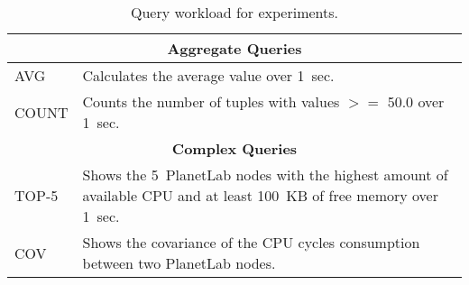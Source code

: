 \begin{table}[h!]
  \hspace{0.8cm}
  \renewcommand{\arraystretch}{1.5}
  \begin{tabular}{|m{3cm}|p{12cm}|}
    \hline
    \multicolumn{2}{|c|}{\bf Aggregate Queries} \\ 
    \hline\hline
    \textnormal{AVG}	&  Calculates the average value over 1~sec. \\ 
    \hline	  
    \textnormal{COUNT}	&  Counts the number of tuples with values $>=$ 50.0 over 1~sec.  \\  
    \hline\hline
    \multicolumn{2}{|c|}{\bf Complex Queries} \\ 
    \hline \hline
    \textnormal{TOP-5}	&  Shows the 5~PlanetLab nodes with the
    highest amount of available CPU and at least 100~KB of free memory over 1~sec.\\
    \hline	  
    \textnormal{COV} &  Shows the covariance of the CPU cycles consumption between two PlanetLab nodes.
    \\
    \hline	  
  \end{tabular}
  \caption{Query workload for experiments.}
  \label{table:queries}
\end{table}
